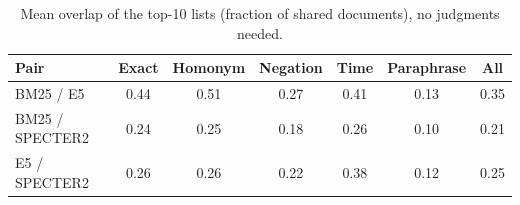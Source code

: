 \begin{table}[t]
\centering
\small
\caption{Mean overlap of the top-10 lists (fraction of shared documents), no judgments needed.}
\label{tab:overlap}
\begin{tabular}{lcccccc}
\toprule
Pair & Exact & Homonym & Negation & Time & Paraphrase & All \\
\midrule
BM25 / E5 & 0.44 & 0.51 & 0.27 & 0.41 & 0.13 & 0.35 \\
BM25 / SPECTER2 & 0.24 & 0.25 & 0.18 & 0.26 & 0.10 & 0.21 \\
E5 / SPECTER2 & 0.26 & 0.26 & 0.22 & 0.38 & 0.12 & 0.25 \\
\bottomrule
\end{tabular}
\end{table}
